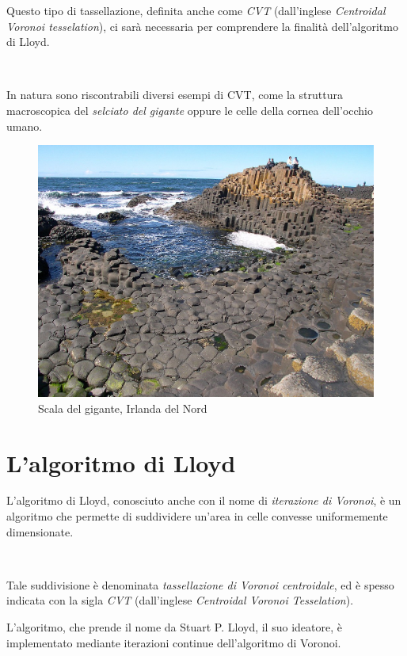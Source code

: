 \documentclass[11pt,a4paper]{report}
\begin{document}
Questo tipo di tassellazione, definita anche come \textit{CVT} (dall'inglese \textit{Centroidal Voronoi tesselation}), ci sarà necessaria per comprendere la finalità dell'algoritmo di Lloyd.

\

In natura sono riscontrabili diversi esempi di CVT, come la struttura macroscopica del \textit{selciato del gigante} oppure le celle della cornea dell'occhio umano.

\begin{figure}[H]
\centering
\includegraphics[width=14cm]{selciato_del_gigante.jpg}
\caption{Scala del gigante, Irlanda del Nord}
\end{figure}

\chapter{L'algoritmo di Lloyd}

L'algoritmo di Lloyd, conosciuto anche con il nome di \textit{iterazione di Voronoi}, è un algoritmo che permette di suddividere un'area in celle convesse uniformemente dimensionate. 

\

Tale suddivisione è denominata \textit{tassellazione di Voronoi centroidale}, ed è spesso indicata con la sigla \textit{CVT} (dall'inglese \textit{Centroidal Voronoi Tesselation}).


L'algoritmo, che prende il nome da Stuart P. Lloyd, il suo ideatore, è implementato mediante iterazioni continue dell'algoritmo di Voronoi.
\end{document}
